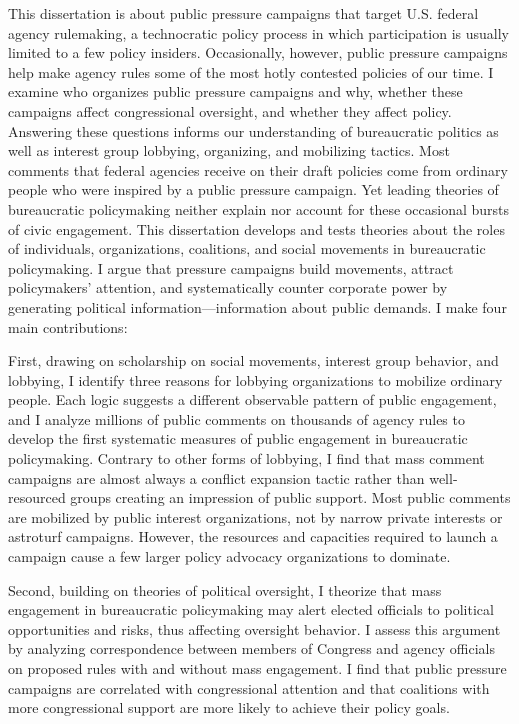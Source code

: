 This dissertation is about public pressure campaigns that target U.S. federal agency rulemaking, a technocratic policy process in which participation is usually limited to a few policy insiders. Occasionally, however, public pressure campaigns help make agency rules some of the most hotly contested policies of our time. I examine who organizes public pressure campaigns and why, whether these campaigns affect congressional oversight, and whether they affect policy. Answering these questions informs our understanding of bureaucratic politics as well as interest group lobbying, organizing, and mobilizing tactics. Most comments that federal agencies receive on their draft policies come from ordinary people who were inspired by a public pressure campaign. Yet leading theories of bureaucratic policymaking neither explain nor account for these occasional bursts of civic engagement. This dissertation develops and tests theories about the roles of individuals, organizations, coalitions, and social movements in bureaucratic policymaking. I argue that pressure campaigns build movements, attract policymakers' attention, and systematically counter corporate power by generating political information---information about public demands.   I make four main contributions:
  
  First, drawing on scholarship on social movements, interest group behavior, and lobbying, I identify three reasons for lobbying organizations to mobilize ordinary people. Each logic suggests a different observable pattern of public engagement, and I analyze millions of public comments on thousands of agency rules to develop the first systematic measures of public engagement in bureaucratic policymaking. Contrary to other forms of lobbying, I find that mass comment campaigns are almost always a conflict expansion tactic rather than well-resourced groups creating an impression of public support. Most public comments are mobilized by public interest organizations, not by narrow private interests or astroturf campaigns. However, the resources and capacities required to launch a campaign cause a few larger policy advocacy organizations to dominate.
  
  Second, building on theories of political oversight, I theorize that mass engagement in bureaucratic policymaking may alert elected officials to political opportunities and risks, thus affecting oversight behavior. I assess this argument by analyzing correspondence between members of Congress and agency officials on proposed rules with and without mass engagement. I find that public pressure campaigns are correlated with congressional attention and that coalitions with more congressional support are more likely to achieve their policy goals.
  
